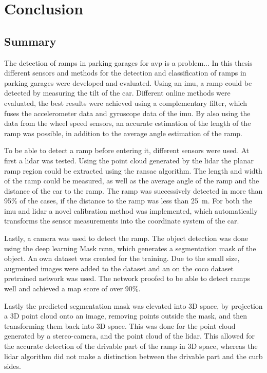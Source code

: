 \chapter{Conclusion}
\label{ch:Conclusion}

\section{Summary}
The detection of ramps in parking garages for \gls{avp} is a problem...
In this thesis different sensors and methods for the detection and classification of ramps in parking garages were developed and evaluated.
Using an \gls{imu}, a ramp could be detected by measuring the tilt of the car.
Different online methods were evaluated, the best results were achieved using a complementary filter, which fuses the accelerometer data and gyroscope data of the \gls{imu}.
By also using the data from the wheel speed sensors, an accurate estimation of the length of the ramp was possible, in addition to the average angle estimation of the ramp.

To be able to detect a ramp before entering it, different sensors were used.
At first a \gls{lidar} was tested.
Using the point cloud generated by the \gls{lidar} the planar ramp region could be extracted using the \gls{ransac} algorithm.
The length and width of the ramp could be measured, as well as the average angle of the ramp and the distance of the car to the ramp.
The ramp was successively detected in more than 95\% of the cases, if the distance to the ramp was less than \SI{25}{\metre}.
For both the \gls{imu} and \gls{lidar} a novel calibration method was implemented, which automatically transforms the sensor measurements into the coordinate system of the car.

Lastly, a camera was used to detect the ramp.
The object detection was done using the deep learning Mask \gls{rcnn}, which generates a segmentation mask of the object.
An own dataset was created for the training.
Due to the small size, augmented images were added to the dataset and an on the \gls{coco} dataset pretrained network was used.
The network proofed to be able to detect ramps well and achieved a \gls{map} score of over 90\%.

Lastly the predicted segmentation mask was elevated into 3D space, by projection a 3D point cloud onto an image, removing points outside the mask, and then transforming them back into 3D space.
This was done for the point cloud generated by a stereo-camera, and the point cloud of the \gls{lidar}.
This allowed for the accurate detection of the drivable part of the ramp in 3D space, whereas the \gls{lidar} algorithm did not make a distinction between the drivable part and the curb sides.



